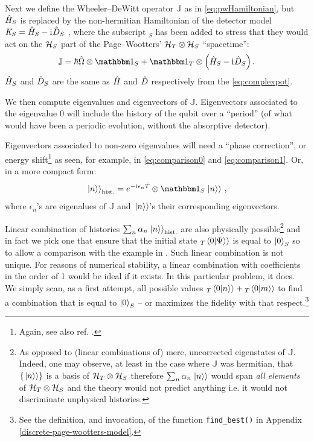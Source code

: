 Next we define the Wheeler--DeWitt operator $\mathbb{J}$ as in
\eqref{eq:pwHamiltonian}, but $\hat{H}_S$ is replaced by the non-hermitian
Hamiltonian of the detector model
$\mathit{K}_S = \hat{H}_S - \mathrm{i}\mkern1mu \hat{D}_S$
\parencite{RuschhauptAbsorption},
where the subscript $_S$ has been added to stress
that they would act on the $\mathcal{H}_S$ part
of the Page--Wootters' $\mathcal{H}_T \otimes \mathcal{H}_S$ ``spacetime'':
\begin{equation}\label{eq:pwHamiltonian:nonUnitary}
  \mathbb{J} = \hbar\op{\Omega}\ox\idop_S + \idop_T\ox\qty(\op{H}_S -\iu \op{D}_S) \,\text{.}
\end{equation}
$\hat{H}_S$ and $\hat{D}_S$ are the same as $\hat{H}$ and $\hat{D}$
respectively from the \eqref{eq:complexpot}.

We then compute eigenvalues and eigenvectors of $\mathbb{J}$.
Eigenvectors associated to the eigenvalue $0$ will include
the history of the qubit over a ``period''
(of what would have been a periodic evolution, without the absorptive detector).

Eigenvectors associated to non-zero eigenvalues will need a ``phase correction'',
or energy shift\footnote{ Again, see also ref. \cite[\it ``The Zero-eigenvalue'']{Lloyd:Time}. }
as seen, for example, in \eqref{eq:comparison0} and \eqref{eq:comparison1}.
Or, in a more compact form:
\begin{equation}
  \dket{n}_{\text{hist.}} = e^{-\iu \epsilon_n \op{T}} \ox \idop_S \dket{n}
  \,\text{,}
\end{equation}
where $\epsilon_n$'s are eigenalues of $\mathbb{J}$ and
$\left.\left| n \right\rangle\right\rangle$'s their corresponding eigenvectors.

\citereset
Linear combination of histories $\sum_n \alpha_n \left.\left| n \right\rangle\right\rangle_{\text{hist.}}$
are also physically possible\footnote{
  As opposed to (linear combinations of) mere, uncorrected eigenstates of $\mathbb{J}$.
  Indeed, one may observe,
  at least in the case where $\mathbb{J}$ was hermitian,
  that $\left\{\left.\left| n \right\rangle\right\rangle\right\}$ is a basis
  of $\mathcal{H}_T \otimes \mathcal{H}_S$ therefore
  $\sum_n \alpha_n \left.\left| n \right\rangle\right\rangle$ would span \emph{all elements}
  of $\mathcal{H}_T \otimes \mathcal{H}_S$ and the theory would not predict anything i.e.
  it would not discriminate unphysical histories.
}
and in fact we pick
one that ensure that the initial state ${}_{T}\!\left.\left\langle 0 \middle| \Psi \right\rangle\right\rangle$ is equal to $\ket{0}_S$
so to allow a comparison with the example in \cite{RuschhauptAbsorption}.
Such linear combination is not unique. For reasons of numerical stability,
a linear combination with coefficients in the order of 1 would be ideal if it exists.
In this particular problem, it does.
We simply scan, as a first attempt, all possible values ${}_{T}\!\left.\left\langle 0 \middle| n \right\rangle\right\rangle + {}_{T}\!\left.\left\langle 0 \middle| m \right\rangle\right\rangle$
to find a combination that is equal to $\ket{0}_S$
-- or maximizes the fidelity with that respect.\footnote{
  See the definition, and invocation, of the function \texttt{find_best()} in Appendix \ref{discrete-page-wootters-model}.
}

